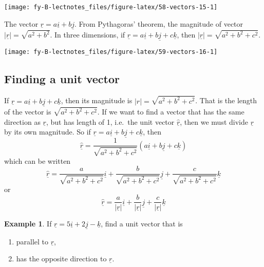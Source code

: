 \documentclass[
  11pt,
  oneside]{book}
\providecommand{\tightlist}{%
  \setlength{\itemsep}{0pt}\setlength{\parskip}{0pt}}
\newcommand{\slide}{}
\theoremstyle{definition}
\theoremstyle{definition}
\newtheorem{example}{Example}[chapter]
\theoremstyle{definition}
\theoremstyle{definition}
\theoremstyle{remark}
\begin{document}
\begin{center}\texttt{[image: fy-B-lectnotes\_files/figure-latex/58-vectors-15-1]} \end{center}

The vector \(\underline r = a\underline i + b\underline j\). From Pythagoras' theorem, the magnitude of vector \(|\underline r| = \sqrt{a^2+b^2}\). In three dimensions, if \(\underline r = a\underline i + b\underline j + c\underline k\), then \(|\underline r| = \sqrt{a^2+b^2+c^2}\).

\begin{center}\texttt{[image: fy-B-lectnotes\_files/figure-latex/59-vectors-16-1]} \end{center}

\slide

\subsection{Finding a unit vector}\label{finding-a-unit-vector}

If \(\underline r = a\underline i + b\underline j + c\underline k\), then its magnitude is \(|r| = \sqrt{a^2+b^2+c^2}\). That is the length of the vector is \(\sqrt{a^2+b^2+c^2}\). If we want to find a vector that has the same direction as \(\underline r\), but has length of 1, i.e.~the unit vector \(\underline{\hat r}\), then we must divide \(\underline r\) by its own magnitude. So if \(\underline r = a\underline i + b\underline j + c\underline k\), then
\[
\underline{\hat r} = \frac{1}{\sqrt{a^2+b^2+c^2}}(a\underline i+b\underline j+c\underline k)
\]
which can be written
\[
\underline{\hat r} = \frac{a}{\sqrt{a^2+b^2+c^2}}\underline i+\frac{b}{\sqrt{a^2+b^2+c^2}}\underline j+\frac{c}{\sqrt{a^2+b^2+c^2}}\underline k
\]
or
\[
\underline{\hat r} = \frac{a}{|\underline r|}\underline i+\frac{b}{|\underline r|}\underline j+\frac{c}{|\underline r|}\underline k
\]
\slide

\begin{example}

If \(\underline r = 5\underline i+2\underline j-\underline k\), find a unit vector that is

\begin{enumerate}
\def\labelenumi{\alph{enumi}.}
\tightlist
\item
  parallel to \(\underline r\),
\item
  has the opposite direction to \(\underline r\).
\end{enumerate}

\end{example}
\end{document}
